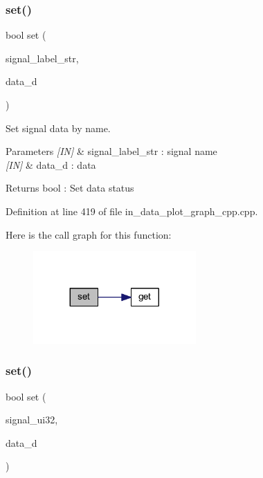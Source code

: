 \subsubsection{set()\hspace{0.1cm}{\footnotesize\ttfamily [1/2]}}
{\footnotesize\ttfamily bool set (\begin{DoxyParamCaption}\item[{wx\+String}]{signal\+\_\+label\+\_\+str,  }\item[{double}]{data\+\_\+d }\end{DoxyParamCaption})}



Set signal data by name. 


\begin{DoxyParams}{Parameters}
{\em \mbox{[}\+I\+N\mbox{]}} & signal\+\_\+label\+\_\+str \+: signal name \\
\hline
{\em \mbox{[}\+I\+N\mbox{]}} & data\+\_\+d \+: data \\
\hline
\end{DoxyParams}
\begin{DoxyReturn}{Returns}
bool \+: Set data status 
\end{DoxyReturn}


Definition at line 419 of file in\+\_\+data\+\_\+plot\+\_\+graph\+\_\+cpp.\+cpp.

Here is the call graph for this function\+:
\nopagebreak
\begin{figure}[H]
\begin{center}
\leavevmode
\includegraphics[width=176pt]{group__data__plot_gaf3139465bf61f3665b4852eaf506464c_cgraph}
\end{center}
\end{figure}
\mbox{\label{group__data__plot_ga3e91f94c70d6bd1bc3b1aa640a92063a}} 
\subsubsection{set()\hspace{0.1cm}{\footnotesize\ttfamily [2/2]}}
{\footnotesize\ttfamily bool set (\begin{DoxyParamCaption}\item[{uint32\+\_\+t}]{signal\+\_\+ui32,  }\item[{double}]{data\+\_\+d }\end{DoxyParamCaption})}




